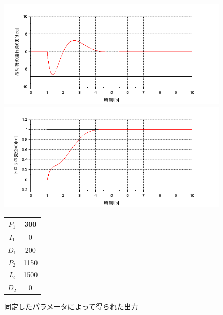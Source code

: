 \documentclass[dvipdfmx,titlepage,a4j]{jsarticle}  %
\begin{document}
\begin{figure}[H]
  \begin{minipage}{4.5cm}
    \centering
    \includegraphics[keepaspectratio, scale=0.35]{../graph/crane/ang-final.png}
  \end{minipage}
  \hfill
  \begin{minipage}{4.5cm}
    \centering
    \includegraphics[keepaspectratio, scale=0.35]{../graph/crane/po-final.png}
  \end{minipage}
  \hfill
  \begin{minipage}{3cm}
    \begin{center}
      \begin{tabular}{c|c}
        \hline
        $P_1$ & 300  \\ \hline
        $I_1$ & 0    \\ \hline
        $D_1$ & 200  \\ \hline
        $P_2$ & 1150 \\ \hline
        $I_2$ & 1500 \\ \hline
        $D_2$ & 0    \\
        \hline
      \end{tabular}
    \end{center}
  \end{minipage}
  \hfill
  \caption{同定したパラメータによって得られた出力}
  \label{fig:crane:final}
\end{figure}
\end{document}
